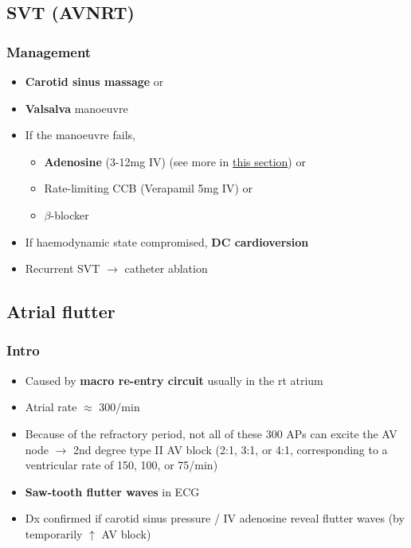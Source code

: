 \documentclass[
  12pt,
]{memoir}
\providecommand{\tightlist}{%
  \setlength{\itemsep}{0pt}\setlength{\parskip}{0pt}}
\begin{document}
\hypertarget{svt-avnrt}{%
\subsection{SVT (AVNRT)}\label{svt-avnrt}}

\hypertarget{management}{%
\subsubsection{Management}\label{management}}

\begin{itemize}
\tightlist
\item
  \textbf{Carotid sinus massage} or
\item
  \textbf{Valsalva} manoeuvre
\item
  If the manoeuvre fails,

  \begin{itemize}
  \tightlist
  \item
    \textbf{Adenosine} (3-12mg IV) (see more in
    \hyperref[ssec:otheranti]{this
       section}) or
  \item
    Rate-limiting CCB (Verapamil 5mg IV) or
  \item
    \(\beta\)-blocker
  \end{itemize}
\item
  If haemodynamic state compromised, \textbf{DC cardioversion}
\item
  Recurrent SVT \(\rightarrow\) catheter ablation
\end{itemize}

\hypertarget{atrial-flutter}{%
\subsection{Atrial flutter}\label{atrial-flutter}}

\hypertarget{intro}{%
\subsubsection{Intro}\label{intro}}

\begin{itemize}
\tightlist
\item
  Caused by \textbf{macro re-entry circuit} usually in the rt atrium
\item
  Atrial rate \(\approx\) 300/min
\item
  Because of the refractory period, not all of these 300 APs can excite
  the AV node \(\rightarrow\) 2nd degree type II AV block (2:1, 3:1, or
  4:1, corresponding to a ventricular rate of 150, 100, or 75/min)
\item
  \textbf{Saw-tooth flutter waves} in ECG
\item
  Dx confirmed if carotid sinus pressure / IV adenosine reveal flutter
  waves (by temporarily \(\uparrow\) AV block)
\end{itemize}
\end{document}
